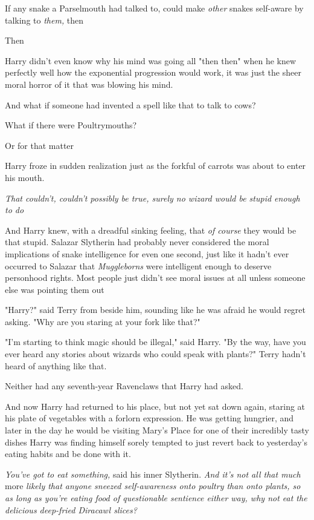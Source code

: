 If any snake a Parselmouth had talked to, could make \emph{other} snakes
self-aware by talking to \emph{them,} then{\el}

Then{\el}

Harry didn't even know why his mind was going all "then{\el} then{\el}"
when he knew perfectly well how the exponential progression would work, it was
just the sheer moral horror of it that was blowing his mind.

And what if someone had invented a spell like that to talk to cows?

What if there were Poultrymouths?

Or for that matter{\el}

Harry froze in sudden realization just as the forkful of carrots was about to
enter his mouth.

\emph{That couldn't, couldn't possibly be true, surely no wizard would be
stupid enough to do }

And Harry knew, with a dreadful sinking feeling, that \emph{of course} they
would be that stupid. Salazar Slytherin had probably never considered the moral
implications of snake intelligence for even one second, just like it hadn't
ever occurred to Salazar that \emph{Muggleborns} were intelligent enough to
deserve personhood rights. Most people just didn't see moral issues at all
unless someone else was pointing them out{\el}

"Harry?" said Terry from beside him, sounding like he was afraid he would
regret asking. "Why are you staring at your fork like that?"

"I'm starting to think magic should be illegal," said Harry. "By the way, have
you ever heard any stories about wizards who could speak with plants?"
\sbreak
Terry hadn't heard of anything like that.

Neither had any seventh-year Ravenclaws that Harry had asked.

And now Harry had returned to his place, but not yet sat down again, staring at
his plate of vegetables with a forlorn expression. He was getting hungrier, and
later in the day he would be visiting Mary's Place for one of their incredibly
tasty dishes{\el} Harry was finding himself sorely tempted to just revert
back to yesterday's eating habits and be done with it.

\emph{You've got to eat something,} said his inner Slytherin. \emph{And it's
not all that much} more \emph{likely that anyone sneezed self-awareness onto
poultry than onto plants, so as long as you're eating food of questionable
sentience either way, why not eat the delicious deep-fried Diracawl slices?}

